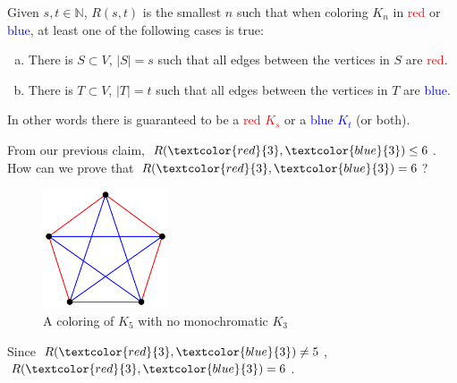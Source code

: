 \documentclass[00_complete]{subfiles}
\begin{document}
\begin{definition}
    Given $s,t \in \mathbb{N}$, $R(s,t)$ is the smallest $n$ such that when
    coloring $K_n$ in \textcolor{red}{red} or \textcolor{blue}{blue}, at least
    one of the following cases is true:
    \begin{enumerate}[a.] \tightlist
        \item There is $S \subset V$, $|S|=s$ such that all edges between the
            vertices in $S$ are \textcolor{red}{red}.
        \item There is $T \subset V$, $|T|=t$ such that all edges between the
            vertices in $T$ are \textcolor{blue}{blue}.
    \end{enumerate}
    In other words there is guaranteed to be a \textcolor{red}{red $K_s$} or a
    \textcolor{blue}{blue $K_t$} (or both).
\end{definition}
From our previous claim, $R(\textcolor{red}{3},\textcolor{blue}{3}) \leq 6$.
How can we prove that $R(\textcolor{red}{3},\textcolor{blue}{3})= 6$?
    \begin{figure}[ht]
        \centering
        \includegraphics[width=0.33\textwidth]{w12_k5}
        \caption{A coloring of $K_5$ with no monochromatic $K_3$}
    \end{figure}

Since $R(\textcolor{red}{3},\textcolor{blue}{3}) \neq 5$,
$R(\textcolor{red}{3},\textcolor{blue}{3}) = 6$.
\end{document}
